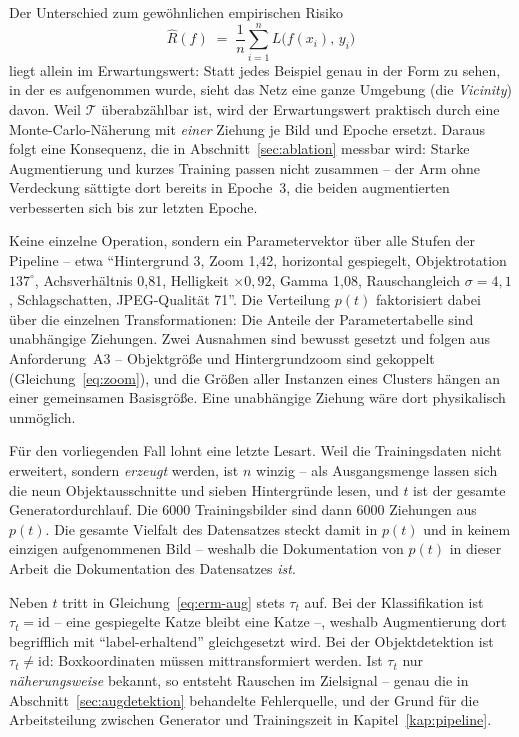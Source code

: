 Der Unterschied zum gewöhnlichen empirischen Risiko
\[
\hat{R}(f) \;=\; \frac{1}{n}\sum_{i=1}^{n} L\big(f(x_i),\, y_i\big)
\]
liegt allein im Erwartungswert: Statt jedes Beispiel genau in der Form zu sehen,
in der es aufgenommen wurde, sieht das Netz eine ganze Umgebung (die \emph{Vicinity}) davon. Weil
$\mathcal{T}$ überabzählbar ist, wird der Erwartungswert praktisch durch eine
Monte-Carlo-Näherung mit \emph{einer} Ziehung je Bild und Epoche ersetzt. Daraus
folgt eine Konsequenz, die in Abschnitt~\ref{sec:ablation} messbar wird: Starke
Augmentierung und kurzes Training passen nicht zusammen -- der Arm ohne
Verdeckung sättigte dort bereits in Epoche~3, die beiden augmentierten
verbesserten sich bis zur letzten Epoche.

 Keine einzelne Operation,
sondern ein Parametervektor über alle Stufen der Pipeline -- etwa
\enquote{Hintergrund 3, Zoom 1,42, horizontal gespiegelt, Objektrotation
$137^\circ$, Achsverhältnis 0,81, Helligkeit $\times 0{,}92$, Gamma 1,08,
Rauschangleich $\sigma = 4{,}1$, Schlagschatten, JPEG-Qualität 71}. Die
Verteilung $p(t)$ faktorisiert dabei über die einzelnen Transformationen: Die
Anteile der Parametertabelle sind unabhängige Ziehungen. Zwei Ausnahmen sind
bewusst gesetzt und folgen aus Anforderung~A3 -- Objektgröße und
Hintergrundzoom sind gekoppelt (Gleichung~\eqref{eq:zoom}), und die Größen aller
Instanzen eines Clusters hängen an einer gemeinsamen Basisgröße. Eine
unabhängige Ziehung wäre dort physikalisch unmöglich.


Für den vorliegenden Fall lohnt eine letzte Lesart. Weil die Trainingsdaten
nicht erweitert, sondern \emph{erzeugt} werden, ist $n$ winzig -- als
Ausgangsmenge lassen sich die neun Objektausschnitte und sieben Hintergründe
lesen, und $t$ ist der gesamte Generatordurchlauf. Die 6000 Trainingsbilder sind
dann 6000 Ziehungen aus $p(t)$. Die gesamte Vielfalt des Datensatzes steckt
damit in $p(t)$ und in keinem einzigen aufgenommenen Bild -- weshalb die
Dokumentation von $p(t)$ in dieser Arbeit die Dokumentation des Datensatzes
\emph{ist}.

 Neben $t$ tritt in
Gleichung~\eqref{eq:erm-aug} stets $\tau_t$ auf. Bei der Klassifikation ist
$\tau_t = \mathrm{id}$ -- eine gespiegelte Katze bleibt eine Katze --, weshalb
Augmentierung dort begrifflich mit \enquote{label-erhaltend} gleichgesetzt wird.
Bei der Objektdetektion ist $\tau_t \neq \mathrm{id}$: Boxkoordinaten müssen
mittransformiert werden. Ist $\tau_t$ nur \emph{näherungsweise} bekannt, so
entsteht Rauschen im Zielsignal -- genau die in
Abschnitt~\ref{sec:augdetektion} behandelte Fehlerquelle, und der Grund für die
Arbeitsteilung zwischen Generator und Trainingszeit in
Kapitel~\ref{kap:pipeline}.

